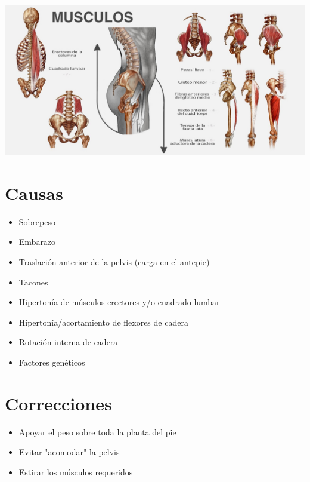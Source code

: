\documentclass[hyperref={pdfpagelabels=false},xcolor=pst,pdf,fragile]{beamer}
\begin{document}
\begin{frame}
    \begin{center}
	  \includegraphics[scale=0.3]{img/musculos.jpg}
    \end{center}

\end{frame}

\section{Causas}
\begin{frame}
  \begin{itemize}
	\item Sobrepeso
	\pause
	\item Embarazo
	\pause
	\item Traslación anterior de la pelvis (carga en el antepie)
	\pause
	\item Tacones
	\pause
	\item Hipertonía de músculos erectores y/o cuadrado lumbar
	\pause
	\item Hipertonía/acortamiento de flexores de cadera
	\pause
	\item Rotación interna de cadera
	\pause
	\item Factores genéticos
  \end{itemize}

\end{frame}

\section{Correcciones}
\begin{frame}
  \begin{itemize}
	\item Apoyar el peso sobre toda la planta del pie
	\pause
	\item Evitar "acomodar" la pelvis
	\pause
	\item Estirar los músculos requeridos
	\pause
  \end{itemize}
\end{frame}
\end{document}
